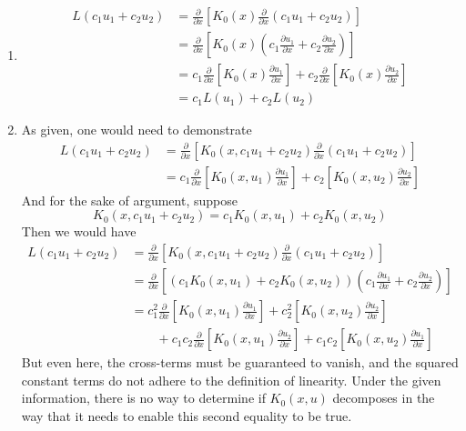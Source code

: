 \documentclass[a4paper]{article}
\begin{document}
\begin{enumerate}[label=(\alph*)]
	\item \begin{align*}
		L \!\left( c_{1}u_{1} + c_{2}u_{2} \right) & = \frac{\partial }{\partial x}\!\left[ K_{0}\!\left( x \right)\frac{\partial }{\partial x}\!\left( c_{1}u_{1} + c_{2}u_{2} \right) \right] \\
		 & = \frac{\partial }{\partial x}\!\left[ K_{0}\!\left( x \right)\!\left( c_{1}\frac{\partial u_{1}}{\partial x} + c_{2}\frac{\partial u_{2}}{\partial x} \right) \right] \\ 
		 & = c_{1}\frac{\partial }{\partial x}\!\left[ K_{0}\!\left( x \right)\frac{\partial u_{1}}{\partial x} \right] + c_{2}\frac{\partial }{\partial x}\!\left[ K_{0}\!\left( x \right)\frac{\partial u_{2}}{\partial x} \right] \\
		 & = c_{1}L \!\left( u_{1} \right) + c_{2}L \!\left( u_{2} \right)
	\end{align*}
	\item As given, one would need to demonstrate 
	\begin{align*}
		L \!\left( c_{1}u_{1} + c_{2}u_{2} \right) & = \frac{\partial }{\partial x}\!\left[ K_{0}\!\left( x, c_{1}u_{1} + c_{2}u_{2} \right)\frac{\partial }{\partial x}\!\left( c_{1}u_{1} + c_{2}u_{2} \right) \right] \\
		 & = c_{1}\frac{\partial }{\partial x}\!\left[ K_{0}\!\left( x,u_{1} \right)\frac{\partial u_{1}}{\partial x} \right] + c_{2}\!\left[ K_{0}\!\left( x,u_{2} \right)\frac{\partial u_{2}}{\partial x} \right]
	\end{align*}
	And for the sake of argument, suppose
	\[
		K_{0}\!\left( x,c_{1}u_{1} + c_{2}u_{2} \right) = c_{1}K_{0}\!\left( x,u_{1} \right) + c_{2}K_{0}\!\left( x,u_{2} \right) 
	\]
	Then we would have
	\begin{align*}
		L \!\left( c_{1}u_{1} + c_{2}u_{2} \right) & = \frac{\partial }{\partial x}\!\left[ K_{0}\!\left( x, c_{1}u_{1} + c_{2}u_{2} \right)\frac{\partial }{\partial x}\!\left( c_{1}u_{1} + c_{2}u_{2} \right) \right] \\
		 & = \frac{\partial }{\partial x}\!\left[ \!\left( c_{1}K_{0}\!\left( x,u_{1} \right) + c_{2}K_{0}\!\left( x,u_{2} \right) \right) \!\left( c_{1}\frac{\partial u_{1}}{\partial x} + c_{2}\frac{\partial u_{2}}{\partial x} \right) \right] \\
		 & = c^{2}_{1}\frac{\partial }{\partial x}\!\left[ K_{0}\!\left( x,u_{1} \right)\frac{\partial u_{1}}{\partial x} \right] + c^{2}_{2}\!\left[ K_{0}\!\left( x,u_{2} \right)\frac{\partial u_{2}}{\partial x} \right] \\ 
		 & \qquad + c_{1}c_{2}\frac{\partial }{\partial x}\!\left[ K_{0}\!\left( x,u_{1} \right)\frac{\partial u_{2}}{\partial x} \right] + c_{1}c_{2}\!\left[ K_{0}\!\left( x,u_{2} \right)\frac{\partial u_{1}}{\partial x} \right]
	\end{align*}
	But even here, the cross-terms must be guaranteed to vanish, and the squared constant terms do not adhere to the definition of linearity.
	Under the given information, there is no way to determine if \( K_{0}\!\left( x,u \right) \) decomposes in the way that it needs to enable this second equality to be true.
\end{enumerate}
\end{document}
